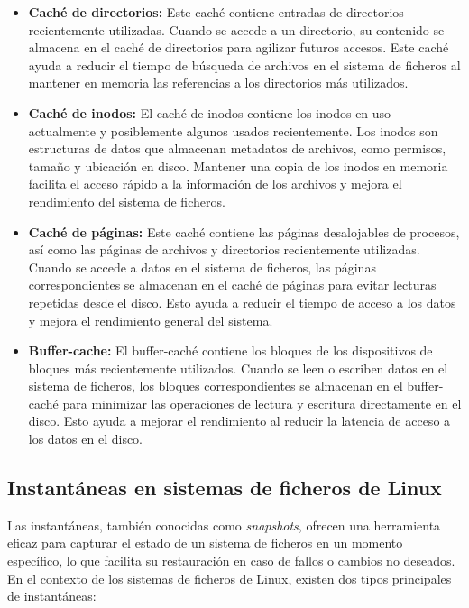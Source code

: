 \begin{itemize}
    \item \textbf{Caché de directorios:} Este caché contiene entradas de directorios recientemente utilizadas. Cuando se accede a un directorio, su contenido se almacena en el caché de directorios para agilizar futuros accesos. Este caché ayuda a reducir el tiempo de búsqueda de archivos en el sistema de ficheros al mantener en memoria las referencias a los directorios más utilizados. 
    
    \item \textbf{Caché de inodos:} El caché de inodos contiene los inodos en uso actualmente y posiblemente algunos usados recientemente. Los inodos son estructuras de datos que almacenan metadatos de archivos, como permisos, tamaño y ubicación en disco. Mantener una copia de los inodos en memoria facilita el acceso rápido a la información de los archivos y mejora el rendimiento del sistema de ficheros. 
    
    \item \textbf{Caché de páginas:} Este caché contiene las páginas desalojables de procesos, así como las páginas de archivos y directorios recientemente utilizadas. Cuando se accede a datos en el sistema de ficheros, las páginas correspondientes se almacenan en el caché de páginas para evitar lecturas repetidas desde el disco. Esto ayuda a reducir el tiempo de acceso a los datos y mejora el rendimiento general del sistema.
    
    \item \textbf{Buffer-cache:} El buffer-caché contiene los bloques de los dispositivos de bloques más recientemente utilizados. Cuando se leen o escriben datos en el sistema de ficheros, los bloques correspondientes se almacenan en el buffer-caché para minimizar las operaciones de lectura y escritura directamente en el disco. Esto ayuda a mejorar el rendimiento al reducir la latencia de acceso a los datos en el disco.
    
\end{itemize}

\subsection{Instantáneas en sistemas de ficheros de Linux} 
Las instantáneas, también conocidas como \textit{snapshots}, ofrecen una herramienta eficaz para capturar el estado de un sistema de ficheros en un momento específico, lo que facilita su restauración en caso de fallos o cambios no deseados. En el contexto de los sistemas de ficheros de Linux, existen dos tipos principales de instantáneas:

